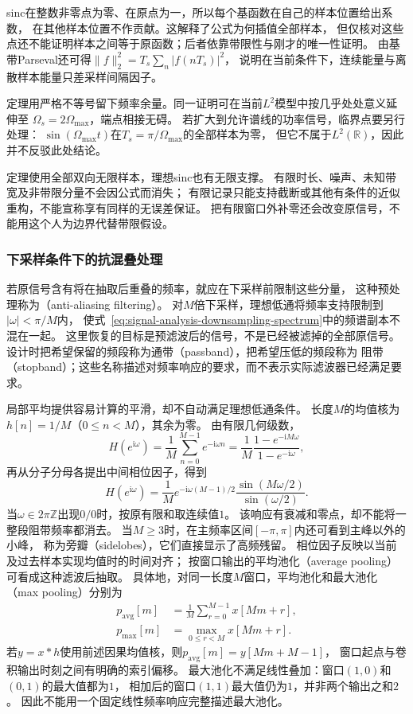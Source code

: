 sinc在整数非零点为零、在原点为一，所以每个基函数在自己的样本位置给出系数，
在其他样本位置不作贡献。这解释了公式为何插值全部样本，
但仅核对这些点还不能证明样本之间等于原函数；后者依靠带限性与刚才的唯一性证明。
由基带Parseval还可得$\|f\|_2^2=T_s\sum_n|f(nT_s)|^2$，
说明在当前条件下，连续能量与离散样本能量只差采样间隔因子。

定理用严格不等号留下频率余量。同一证明可在当前$L^2$模型中按几乎处处意义延伸至
$\Omega_s=2\Omega_{\max}$，端点相接无碍。
若扩大到允许谱线的功率信号，临界点要另行处理：
$\sin(\Omega_{\max}t)$在$T_s=\pi/\Omega_{\max}$的全部样本为零，
但它不属于$L^2(\mathbb R)$，因此并不反驳此处结论。

定理使用全部双向无限样本，理想sinc也有无限支撑。
有限时长、噪声、未知带宽及非带限分量不会因公式而消失；
有限记录只能支持截断或其他有条件的近似重构，不能宣称享有同样的无误差保证。
把有限窗口外补零还会改变原信号，不能用这个人为边界代替带限假设。

\subsubsection{下采样条件下的抗混叠处理}

若原信号含有将在抽取后重叠的频率，就应在下采样前限制这些分量，
这种预处理称为（anti-aliasing filtering）。
对$M$倍下采样，理想低通将频率支持限制到$|\omega|<\pi/M$内，
使式~\eqref{eq:signal-analysis-downsampling-spectrum}中的频谱副本不混在一起。
这里恢复的目标是预滤波后的信号，不是已经被滤掉的全部原信号。
设计时把希望保留的频段称为通带（passband），把希望压低的频段称为
阻带（stopband）；这些名称描述对频率响应的要求，而不表示实际滤波器已经满足要求。

局部平均提供容易计算的平滑，却不自动满足理想低通条件。
长度$M$的均值核为$h[n]=1/M$（$0\leq n<M$），其余为零。
由有限几何级数，
\[
  H(e^{\mathrm i\omega})=\frac1M\sum_{n=0}^{M-1}e^{-\mathrm i\omega n}
  =\frac1M\frac{1-e^{-\mathrm iM\omega}}{1-e^{-\mathrm i\omega}},
\]
再从分子分母各提出中间相位因子，得到
\begin{equation}
  H(e^{\mathrm i\omega})=
  \frac1M e^{-\mathrm i\omega(M-1)/2}
  \frac{\sin(M\omega/2)}{\sin(\omega/2)}.
  \label{eq:signal-analysis-moving-average-response}
\end{equation}
当$\omega\in2\pi\mathbb Z$出现$0/0$时，按原有限和取连续值$1$。
该响应有衰减和零点，却不能将一整段阻带频率都消去。
当$M\geq3$时，在主频率区间$[-\pi,\pi]$内还可看到主峰以外的小峰，
称为旁瓣（sidelobes），它们直接显示了高频残留。
相位因子反映以当前及过去样本实现均值时的时间对齐；
按窗口输出的平均池化（average pooling）可看成这种滤波后抽取。
具体地，对同一长度$M$窗口，平均池化和最大池化（max pooling）分别为
\[
 \begin{aligned}
  p_{\mathrm{avg}}[m]&=\frac1M\sum_{r=0}^{M-1}x[Mm+r],\\
  p_{\mathrm{max}}[m]&=\max_{0\leq r<M}x[Mm+r].
 \end{aligned}
\]
若$y=x*h$使用前述因果均值核，则$p_{\mathrm{avg}}[m]=y[Mm+M-1]$，
窗口起点与卷积输出时刻之间有明确的索引偏移。
最大池化不满足线性叠加：窗口$(1,0)$和$(0,1)$的最大值都为$1$，
相加后的窗口$(1,1)$最大值仍为$1$，并非两个输出之和$2$。
因此不能用一个固定线性频率响应完整描述最大池化。

